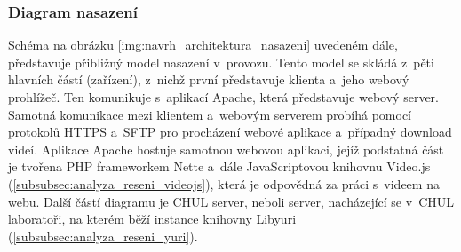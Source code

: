 \documentclass[thesis=M,czech]{FITthesis}[2012/06/26]
\begin{document}
\subsubsection{Diagram nasazení} \label{subsubsec:navrh_architektura_nasazeni}
Schéma na obrázku \ref{img:navrh_architektura_nasazeni} uvedeném dále, představuje přibližný model nasazení v~provozu. Tento model se skládá z~pěti hlavních částí (zařízení), z~nichž první představuje klienta a~jeho webový prohlížeč. Ten komunikuje
s~aplikací Apache, která představuje webový server. Samotná komunikace mezi klientem a~webovým serverem probíhá pomocí protokolů HTTPS a~SFTP pro procházení webové aplikace a~případný download videí. Aplikace Apache hostuje samotnou webovou aplikaci, jejíž podstatná část je tvořena PHP frameworkem Nette a~dále JavaScriptovou knihovnu Video.js (\ref{subsubsec:analyza_reseni_videojs}), která je odpovědná za práci s~videem na webu. Další částí diagramu je CHUL server, neboli server, nacházející se v~CHUL laboratoři, na kterém běží instance knihovny Libyuri (\ref{subsubsec:analyza_reseni_yuri}).  
\end{document}
